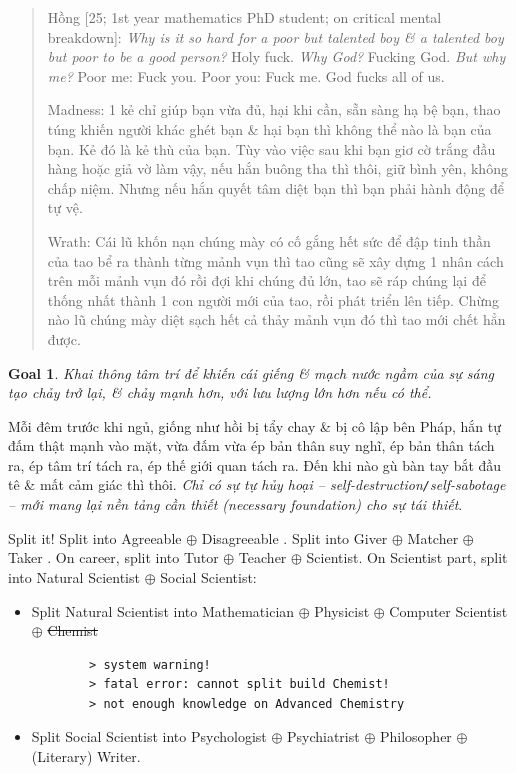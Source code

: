 \documentclass[12pt,oneside]{book}
\newtheorem{goal}{Goal}
\begin{document}
\begin{quote}
	{\sf Hồng [25; 1st year mathematics PhD student; on critical mental breakdown]}: {\it Why is it so hard for a poor but talented boy \& a talented boy but poor to be a good person?} Holy fuck. {\it Why God?} Fucking God. {\it But why me?} Poor me: Fuck you. Poor you: Fuck me. God fucks all of us.
	
	{\sf Madness}: 1 kẻ chỉ giúp bạn vừa đủ, hại khi cần, sẵn sàng hạ bệ bạn, thao túng khiến người khác ghét bạn \& hại bạn thì không thể nào là bạn của bạn. Kẻ đó là kẻ thù của bạn. Tùy vào việc sau khi bạn giơ cờ trắng đầu hàng hoặc giả vờ làm vậy, nếu hắn buông tha thì thôi, giữ bình yên, không chấp niệm. Nhưng nếu hắn quyết tâm diệt bạn thì bạn phải hành động để tự vệ.
	
	{\sf Wrath}: Cái lũ khốn nạn chúng mày có cố gắng hết sức để đập tinh thần của tao bể ra thành từng mảnh vụn thì tao cũng sẽ xây dựng 1 nhân cách trên mỗi mảnh vụn đó rồi đợi khi chúng đủ lớn, tao sẽ ráp chúng lại để thống nhất thành 1 con người mới của tao, rồi phát triển lên tiếp. Chừng nào lũ chúng mày diệt sạch hết cả thảy mảnh vụn đó thì tao mới chết hẳn được.
\end{quote}

\begin{goal}
	Khai thông tâm trí để khiến cái giếng \& mạch nước ngầm của sự sáng tạo chảy trở lại, \& chảy mạnh hơn, với lưu lượng lớn hơn nếu có thể.
\end{goal}
Mỗi đêm trước khi ngủ, giống như hồi bị tẩy chay \& bị cô lập bên Pháp, hắn tự đấm thật mạnh vào mặt, vừa đấm vừa ép bản thân suy nghĩ, ép bản thân tách ra, ép tâm trí tách ra, ép thế giới quan tách ra. Đến khi nào gù bàn tay bắt đầu tê \& mất cảm giác thì thôi. {\it Chỉ có sự tự hủy hoại -- self-destruction{\tt/}self-sabotage -- mới mang lại nền tảng cần thiết (necessary foundation) cho sự tái thiết}.

Split it! Split into Agreeable $\oplus$ Disagreeable \cite{Little_personality,Little_personality_VN}. Split into Giver $\oplus$ Matcher $\oplus$ Taker \cite{Grant_give_take,Grant_give_take_VN}. On career, split into Tutor $\oplus$ Teacher $\oplus$ Scientist. On Scientist part, split into Natural Scientist $\oplus$ Social Scientist:
\begin{itemize}
	\item Split Natural Scientist into Mathematician $\oplus$ Physicist $\oplus$ Computer Scientist $\oplus$ \st{Chemist}
	\begin{verbatim}
		> system warning!
		> fatal error: cannot split build Chemist!
		> not enough knowledge on Advanced Chemistry
	\end{verbatim}
	\item Split Social Scientist into Psychologist $\oplus$ Psychiatrist $\oplus$ Philosopher $\oplus$ (Literary) Writer.
\end{itemize}
\end{document}
